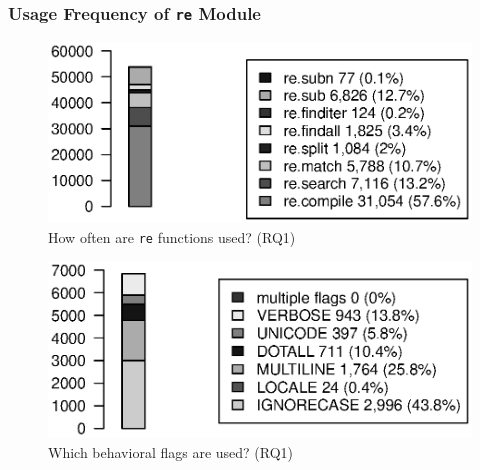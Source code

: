 


\subsubsection{Usage Frequency of {\tt re} Module}

\begin{figure}[tb]
\centering
\includegraphics[width=\columnwidth]{../analysis_output/partFunctions.eps}
\vspace{-6pt}
\caption{How often are  {\tt re} functions used? (RQ1)}
\vspace{-6pt}
\label{fig:partFunctions}
\end{figure}

\begin{figure}[tb]
\centering
\includegraphics[width=0.9\columnwidth]{../analysis_output/partFlags.eps}
\vspace{-6pt}
\caption{Which behavioral flags are used? (RQ1)}
\label{fig:partFlags}
\end{figure}

